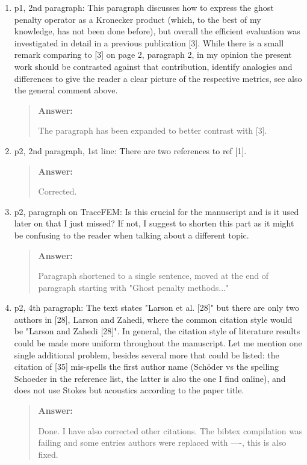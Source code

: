 \documentclass[11pt, a4paper]{article}
\newenvironment{answer}{%
      \begin{quote}%
            \color{blue!80!black}%
            \textbf{Answer:}%
            }{%
      \end{quote}%
}
\begin{document}
\begin{enumerate}[label=\textbullet, wide, labelindent=0pt]
      \item p1, 2nd paragraph: This paragraph discusses how to express the ghost penalty operator as a Kronecker
            product (which, to the best of my knowledge, has not been done before), but overall the efficient
            evaluation
            was
            investigated in detail in a previous publication [3]. While there is a small remark comparing to [3] on
            page
            2,
            paragraph 2, in my opinion the present work should be contrasted against that contribution, identify
            analogies and
            differences to give the reader a clear picture of the respective metrics, see also the general comment
            above.
            \begin{answer}
                  The paragraph has been expanded to better contrast with [3].
            \end{answer}

      \item p2, 2nd paragraph, 1st line: There are two references to ref [1].
            \begin{answer}
                  Corrected.
            \end{answer}

      \item p2, paragraph on TraceFEM: Is this crucial for the manuscript and is it used later on that I just missed?
            If not, I suggest to shorten this part as it might be confusing to the reader when talking about a
            different
            topic.
            \begin{answer}
                  Paragraph shortened to a single sentence, moved at the end of paragraph starting with "Ghost penalty
                  methods..."
            \end{answer}

      \item p2, 4th paragraph: The text states "Larson et al. [28]" but there are only two authors in [28], Larson
            and Zahedi, where the common citation style would be "Larson and Zahedi [28]". In general, the citation
            style
            of
            literature results could be made more uniform throughout the manuscript. Let me mention one single
            additional
            problem,
            besides several more that could be listed: the citation of [35] mis-spells the first author name (Sch\"oder
            vs the
            spelling Schoeder in the reference list, the latter is also the one I find online), and does not use Stokes
            but
            acoustics according to the paper title.
            \begin{answer}
                  Done.  I have also corrected other citations. The bibtex compilation was failing and some entries
                  authors were replaced with ----, this is also fixed.
            \end{answer}


\end{enumerate}
\end{document}
